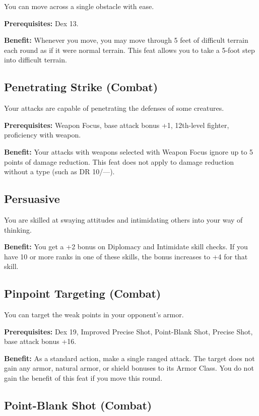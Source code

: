 				
You can move across a single obstacle with ease.
				
\textbf{Prerequisites:} Dex 13.
				
\textbf{Benefit:} Whenever you move, you may move through 5 feet of difficult terrain each round as if it were normal terrain. This feat allows you to take a 5-foot step into difficult terrain.
				
\subsection{Penetrating Strike (Combat)}

				
Your attacks are capable of penetrating the defenses of some creatures.
				
\textbf{Prerequisites:} Weapon Focus, base attack bonus +1, 12th-level fighter, proficiency with weapon.
				
\textbf{Benefit:} Your attacks with weapons selected with Weapon Focus ignore up to 5 points of damage reduction. This feat does not apply to damage reduction without a type (such as DR 10/---).
				
\subsection{Persuasive}

				
You are skilled at swaying attitudes and intimidating others into your way of thinking.
				
\textbf{Benefit:} You get a +2 bonus on Diplomacy and Intimidate skill checks. If you have 10 or more ranks in one of these skills, the bonus increases to +4 for that skill.
				
\subsection{Pinpoint Targeting (Combat)}

				
You can target the weak points in your opponent's armor.
				
\textbf{Prerequisites:} Dex 19, Improved Precise Shot, Point-Blank Shot, Precise Shot, base attack bonus +16.
				
\textbf{Benefit:} As a standard action, make a single ranged attack. The target does not gain any armor, natural armor, or shield bonuses to its Armor Class. You do not gain the benefit of this feat if you move this round.
				
\subsection{Point-Blank Shot (Combat)}

